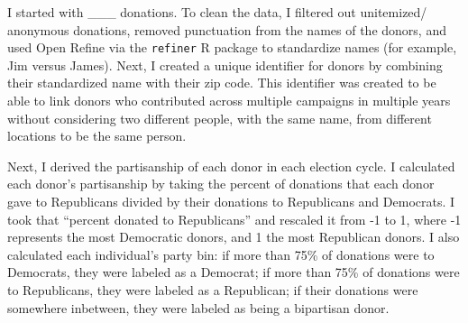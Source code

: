 \documentclass[11pt,]{article}
\begin{document}
I started with \_\_\_ donations. To clean the data, I filtered out
unitemized/ anonymous donations, removed punctuation from the names of
the donors, and used Open Refine via the \texttt{refiner} R package to
standardize names (for example, Jim versus James). Next, I created a
unique identifier for donors by combining their standardized name with
their zip code. This identifier was created to be able to link donors
who contributed across multiple campaigns in multiple years without
considering two different people, with the same name, from different
locations to be the same person.

Next, I derived the partisanship of each donor in each election cycle. I
calculated each donor's partisanship by taking the percent of donations
that each donor gave to Republicans divided by their donations to
Republicans and Democrats. I took that ``percent donated to
Republicans'' and rescaled it from -1 to 1, where -1 represents the most
Democratic donors, and 1 the most Republican donors. I also calculated
each individual's party bin: if more than 75\% of donations were to
Democrats, they were labeled as a Democrat; if more than 75\% of
donations were to Republicans, they were labeled as a Republican; if
their donations were somewhere inbetween, they were labeled as being a
bipartisan donor.
\end{document}
